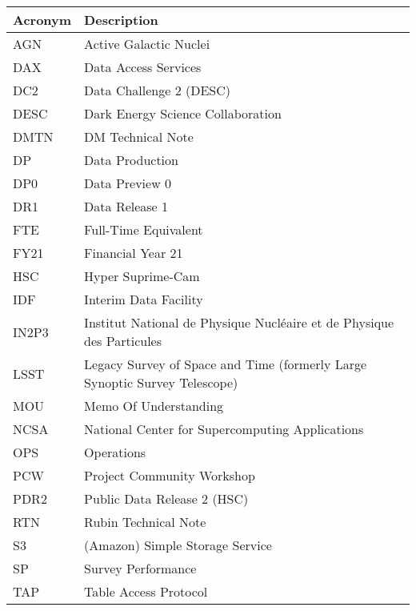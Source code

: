 \addtocounter{table}{-1}
\begin{longtable}{p{}p{}}\hline
\textbf{Acronym} & \textbf{Description}  \\\hline

AGN & Active Galactic Nuclei \\\hline
DAX & Data Access Services \\\hline
DC2 & Data Challenge 2 (DESC) \\\hline
DESC & Dark Energy Science Collaboration \\\hline
DMTN & DM Technical Note \\\hline
DP & Data Production \\\hline
DP0 & Data Preview 0 \\\hline
DR1 & Data Release 1 \\\hline
FTE & Full-Time Equivalent \\\hline
FY21 & Financial Year 21 \\\hline
HSC & Hyper Suprime-Cam \\\hline
IDF & Interim Data Facility \\\hline
IN2P3 & Institut National de Physique Nucléaire et de Physique des Particules \\\hline
LSST & Legacy Survey of Space and Time (formerly Large Synoptic Survey Telescope) \\\hline
MOU & Memo Of Understanding \\\hline
NCSA & National Center for Supercomputing Applications \\\hline
OPS & Operations \\\hline
PCW & Project Community Workshop \\\hline
PDR2 & Public Data Release 2 (HSC) \\\hline
RTN & Rubin Technical Note \\\hline
S3 & (Amazon) Simple Storage Service  \\\hline
SP & Survey Performance \\\hline
TAP & Table Access Protocol \\\hline
\end{longtable}
